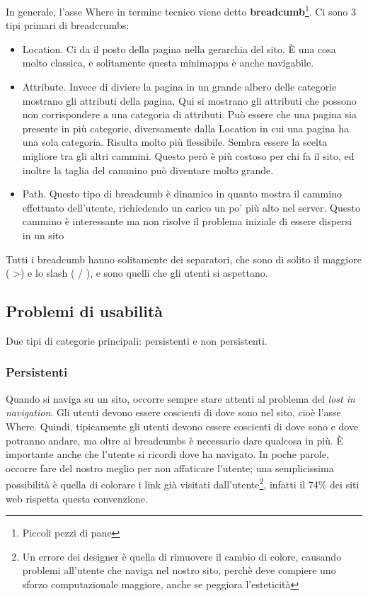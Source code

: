 In generale, l'asse Where in termine tecnico viene detto \textbf{breadcumb}\footnote{Piccoli pezzi di pane}. Ci sono 3 tipi primari di breadcrumbs:
\begin{itemize}

\item Location. Ci da il posto della pagina nella gerarchia del sito. \`E una cosa molto classica, e solitamente questa minimappa \`e anche navigabile.

\item Attribute. Invece di diviere la pagina in un grande albero delle categorie mostrano gli attributi della pagina. Qui si mostrano gli attributi che possono non corrispondere a una categoria di attributi. Pu\`o essere che una pagina sia presente in pi\`u categorie, diversamente dalla Location in cui una pagina ha una sola categoria. Risulta molto pi\`u flessibile. Sembra essere la scelta migliore tra gli altri cammini. Questo per\`o \`e pi\`u costoso per chi fa il sito, ed inoltre la taglia del cammino pu\`o diventare molto grande.

\item Path. Questo tipo di breadcumb \`e dinamico in quanto mostra il cammino effettuato dell'utente, richiedendo un carico un po' pi\`u alto nel server. Questo cammino \`e interessante ma non risolve il problema iniziale di essere dispersi in un sito

\end{itemize}

Tutti i breadcumb hanno solitamente dei separatori, che sono di solito il maggiore ( \textgreater ) e lo slash ( / ), e sono quelli che gli utenti si aspettano.

\subsection{Problemi di usabilit\`a}

Due tipi di categorie principali: persistenti e non persistenti.

\subsubsection{Persistenti}

Quando si naviga su un sito, occorre sempre stare attenti al problema del \textit{lost in navigation}. Gli utenti devono essere coscienti di dove sono nel sito, cio\`e l'asse Where. Quindi, tipicamente gli utenti devono essere coscienti di dove sono e dove potranno andare, ma oltre ai breadcumbs \`e necessario dare qualcosa in pi\`u. \`E importante anche che l'utente si ricordi dove ha navigato. In poche parole, occorre fare del nostro meglio per non affaticare l'utente; una semplicissima possibilit\`a \`e quella di colorare i link gi\`a visitati dall'utente\footnote{Un errore dei designer \`e quella di rimuovere il cambio di colore, causando problemi all'utente che naviga nel nostro sito, perch\`e deve compiere uno sforzo computazionale maggiore, anche se peggiora l'esteticit\`a}, infatti il 74\% dei siti web rispetta questa convenzione.

